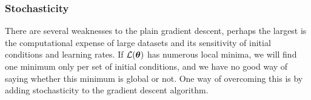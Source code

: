 


        

    \subsubsection{Stochasticity}\label{sec:stochasticity}
        There are several weaknesses to the plain gradient descent, perhaps the largest is the computational expense of large datasets and its sensitivity of initial conditions and learning rates. If $\mathcal{L}(\boldsymbol{\theta})$ has numerous local minima, we will find one minimum only per set of initial conditions, and we have no good way of saying whether this minimum is global or not. One way of overcoming this is by adding stochasticity to the gradient descent algorithm. 

